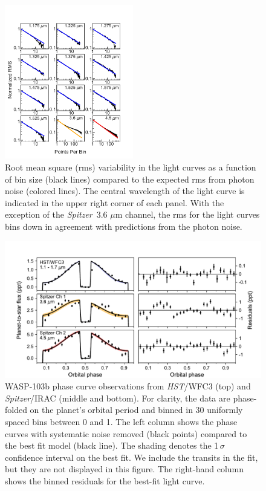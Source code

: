 \documentclass[twocolumn]{aastex61}
\newcommand{\project}[1]{\textsl{#1}}
\newcommand{\HST}{\project{HST}}
\newcommand{\Spitzer}{\project{Spitzer}}
\begin{document}
\begin{figure}
\includegraphics[width = 0.5\textwidth]{Figures/rms.pdf}
\caption{Root mean square (rms) variability in the light curves as a function of bin size (black lines) compared to the expected rms from photon noise (colored lines). The central wavelength of the light curve is indicated in the upper right corner of each panel. With the exception of the \Spitzer\ 3.6 $\mu$m channel, the rms for the light curves bins down in agreement with predictions from the photon noise.}
\label{fig:rms}
\end{figure}

\begin{figure}
\includegraphics[width = 1.0\textwidth]{Figures/phase_curves.pdf}
\caption{WASP-103b phase curve observations from \HST/WFC3 (top) and \Spitzer/IRAC (middle and bottom). For clarity, the data are phase-folded on the planet's orbital period and binned in 30 uniformly spaced bins between 0 and 1. The left column shows the phase curves with systematic noise removed (black points) compared to the best fit model (black line). The shading denotes the  1\,$\sigma$ confidence interval on the best fit. We include the transits in the fit, but they are not displayed in this figure. The right-hand column shows the binned residuals for the best-fit light curve.}
\label{fig:phasecurves}
\end{figure}
\end{document}
